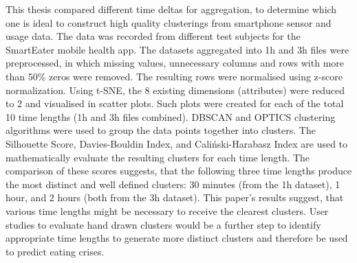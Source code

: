 
This thesis compared different time deltas for aggregation, to determine which one is ideal to construct high quality clusterings from smartphone sensor and usage data. The data was recorded from different test subjects for the SmartEater mobile health app. The datasets aggregated into 1h and 3h files were preprocessed, in which missing values, unnecessary columns and rows with more than 50\% zeros were removed. The resulting rows were normalised using z-score normalization. Using t-SNE, the 8 existing dimensions (attributes) were reduced to 2 and visualised in scatter plots. Such plots were created for each of the total 10 time lengths (1h and 3h files combined). DBSCAN and OPTICS clustering algorithms were used to group the data points together into clusters. The Silhouette Score, Davies-Bouldin Index, and Caliński-Harabasz Index are used to mathematically evaluate the resulting clusters for each time length. The comparison of these scores suggests, that the following three time lengths produce the most distinct and well defined clusters:
30 minutes (from the 1h dataset), 1 hour, and 2 hours (both from the 3h dataset). This paper's results suggest, that various time lengths might be necessary to receive the clearest clusters. User studies to evaluate hand drawn clusters would be a further step to identify appropriate time lengths to generate more distinct clusters and therefore be used to predict eating crises.



